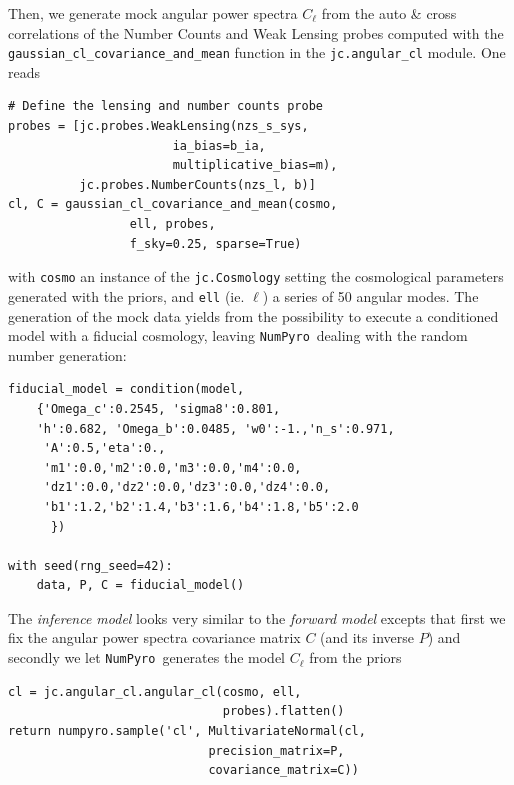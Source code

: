 \documentclass[twocolumn,twocolappendix,nofootinbib,iop]{openjournal}
\newcommand{\numpyro}{\texttt{NumPyro}}
\begin{document}
Then, we generate mock angular power spectra $C_\ell$ from the auto \& cross correlations of the Number Counts and Weak Lensing probes computed with the \texttt{gaussian\_cl\_covariance\_and\_mean} function in the \texttt{jc.angular\_cl} module. One reads
\begin{lstlisting}[language=iPython]
# Define the lensing and number counts probe
probes = [jc.probes.WeakLensing(nzs_s_sys, 
                       ia_bias=b_ia,
                       multiplicative_bias=m),
          jc.probes.NumberCounts(nzs_l, b)]
cl, C = gaussian_cl_covariance_and_mean(cosmo, 
                 ell, probes, 
                 f_sky=0.25, sparse=True)
\end{lstlisting}
with \texttt{cosmo} an instance of the \texttt{jc.Cosmology} setting the cosmological parameters generated with the priors, and \texttt{ell} (ie. $\ell$) a series of 50 angular modes. The generation of the mock data yields from the possibility to execute a conditioned model with a fiducial cosmology, leaving \numpyro\ dealing with the random number generation:
\begin{lstlisting}[language=iPython]
fiducial_model = condition(model,
    {'Omega_c':0.2545, 'sigma8':0.801, 
    'h':0.682, 'Omega_b':0.0485, 'w0':-1.,'n_s':0.971,
     'A':0.5,'eta':0.,
     'm1':0.0,'m2':0.0,'m3':0.0,'m4':0.0,
     'dz1':0.0,'dz2':0.0,'dz3':0.0,'dz4':0.0,
     'b1':1.2,'b2':1.4,'b3':1.6,'b4':1.8,'b5':2.0
      })

with seed(rng_seed=42):
    data, P, C = fiducial_model()
\end{lstlisting}

The \textit{inference model} looks very similar to the \textit{forward model} excepts that first we fix the angular power spectra covariance matrix $C$ (and its inverse $P$) and secondly we let \numpyro\ generates the model $C_{\ell}$ from the priors
\begin{lstlisting}[language=iPython]
cl = jc.angular_cl.angular_cl(cosmo, ell, 
                              probes).flatten()
return numpyro.sample('cl', MultivariateNormal(cl, 
                            precision_matrix=P,
                            covariance_matrix=C))
\end{lstlisting}
\end{document}
